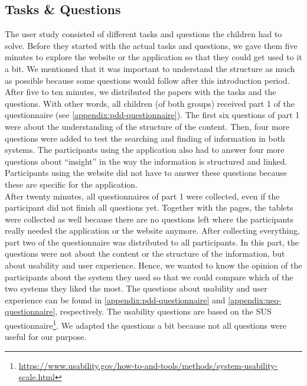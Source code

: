 \subsection{Tasks \& Questions}
The user study consisted of different tasks and questions the children had to solve. Before they started with the actual tasks and questions, we gave them five minutes to explore the website or the application so that they could get used to it a bit. We mentioned that it was important to understand the structure as much as possible because some questions would follow after this introduction period.\\

After five to ten minutes, we distributed the papers with the tasks and the questions. With other words, all children (of both groups) received part 1 of the questionnaire (see \autoref{appendix:pdd-questionnaire}). The first six questions of part 1 were about the understanding of the structure of the content. Then, four more questions were added to test the searching and finding of information in both systems. The participants using the application also had to answer four more questions about ``insight'' in the way the information is structured and linked. Participants using the website did not have to answer these questions because these are specific for the application.\\

After twenty minutes, all questionnaires of part 1 were collected, even if the participant did not finish all questions yet. Together with the pages, the tablets were collected as well because there are no questions left where the participants really needed the application or the website anymore. After collecting everything, part two of the questionnaire was distributed to all participants. In this part, the questions were not about the content or the structure of the information, but about usability and user experience. Hence, we wanted to know the opinion of the participants about the system they used so that we could compare which of the two systems they liked the most. The questions about usability and user experience can be found in \autoref{appendix:pdd-questionnaire} and \autoref{appendix:ueq-questionnaire}, respectively. The usability questions are based on the SUS questionnaire\footnote{\url{https://www.usability.gov/how-to-and-tools/methods/system-usability-scale.html}}. We adapted the questions a bit because not all questions were useful for our purpose.



